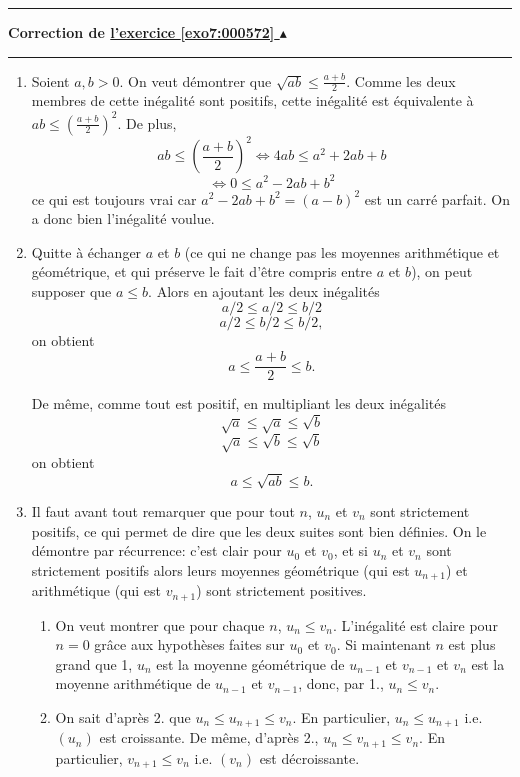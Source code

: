 \documentclass[11pt,a4paper]{article}
\newcounter{exo}
\newcommand{\correction}[1]{\hypertarget{cor7:#1}{}\label{cor7:#1}{\bf Correction de \hyperlink{exo7:#1}{l'exercice \ref{exo7:#1} $\blacktriangle$}}\vspace{1mm}\hrule\vspace{1mm}}
\newcommand{\fincorrection}{\vspace{1mm}\hrule\vspace*{7mm}}
\begin{document}
\fincorrection
\correction{000572}
\begin{enumerate}
    \item  Soient $a,b >0$. On veut d\'emontrer
    que $\sqrt{ab}\leqslant \frac{a+b}{2}$. Comme les deux membres de cette
in\'egalit\'e sont positifs, cette in\'egalit\'e est \'equivalente
\`a $ ab\leqslant (\frac{a+b}{2})^2$. De plus,
$$ ab\leqslant \left( \frac{a+b}{2}\right)^2  \Leftrightarrow 4ab\leqslant a^2+2ab+b$$
$$ \Leftrightarrow 0\leqslant a^2-2ab+b^2$$ ce qui
est toujours vrai car $a^2-2ab+b^2=(a-b)^2$ est un carr\'e parfait. On a
donc bien l'in\'egalit\'e voulue.

  \item  Quitte \`a \'echanger
$a$ et $b$ (ce qui ne change pas les moyennes arithm\'etique et
g\'eom\'etrique, et qui pr\'eserve le fait d'\^etre compris entre
$a$ et $b$), on peut supposer que $a\leqslant b$. Alors en ajoutant les
deux in\'egalit\'es $$a/2 \leqslant a/2 \leqslant b/2$$ $$a/2 \leqslant b/2 \leqslant
b/2,$$ on obtient $$a\leqslant \frac{a+b}{2}\leqslant b.$$

De m\^eme, comme tout est positif, en multipliant les deux
in\'egalit\'es
$$\sqrt{a} \leqslant \sqrt{a} \leqslant \sqrt{b}$$ $$\sqrt{a} \leqslant \sqrt{b} \leqslant
\sqrt{b}$$ on obtient $$a\leqslant \sqrt{ab} \leqslant b.$$

    \item  Il faut avant tout remarquer que pour tout $n$,
    $u_n$ et $v_n$ sont strictement positifs, ce qui
permet de dire que les deux suites sont bien d\'efinies. On le
d\'emontre par r\'ecurrence: c'est clair pour $u_0$ et $v_0$, et
si $u_n$ et $v_n$ sont strictement positifs alors leurs moyennes
g\'eom\'etrique (qui est $u_{n+1}$) et arithm\'etique (qui est $v_{n+1}$) sont
strictement positives.
    \begin{enumerate}
\item  On veut montrer que pour chaque $n$, $u_n\leqslant v_n$. L'in\'egalit\'e est claire pour $n=0$
     gr\^ace aux hypoth\`eses faites sur $u_0$ et $v_0$.
     Si maintenant $n$ est plus grand que 1, $u_{n}$ est la
     moyenne g\'eom\'etrique de $u_{n-1}$ et $v_{n-1}$ et $v_{n}$
     est la moyenne arithm\'etique de $u_{n-1}$ et $v_{n-1}$,
     donc, par 1., $u_n\leqslant v_n$.

 \item  On sait d'apr\`es 2. que $u_n\leqslant u_{n+1}\leqslant v_n$.
 En particulier, $u_n\leqslant u_{n+1}$ i.e. $(u_n)$ est croissante.
 De m\^eme, d'apr\`es 2., $u_n\leqslant v_{n+1}\leqslant v_n$. En particulier,
 $v_{n+1}\leqslant v_n$ i.e. $(v_n)$ est d\'ecroissante.


\end{enumerate}
\end{enumerate}
\end{document}

